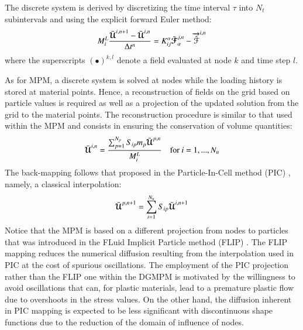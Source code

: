 The discrete system is derived by discretizing the time interval $\tau$ into $N_t$ subintervals and using the explicit forward Euler method:
\begin{equation}
  \label{eq:DGMPM_discrete}
  M^L_i \frac{\bar{{\boldsymbol{\mathcal{U}}}}^{i,n+1} - \bar{{\boldsymbol{\mathcal{U}}}}^{i,n}}{\Delta t^{n} } = K^\alpha_{ij} \bar{{\boldsymbol{\mathcal{F}}}}_{\alpha}^{j,n} - {\overrightarrow{\hat{\mathcal{F}}}}^{i,n}  
\end{equation}
where the superscripts $(\bullet)^{k,l}$ denote a field evaluated at node $k$ and time step $l$.

As for MPM, a discrete system is solved at nodes while the loading history is stored at material points.
Hence, a reconstruction of fields on the grid based on particle values is required as well as a projection of the updated solution from the grid to the material points.
The reconstruction procedure is similar to that used within the MPM and consists in ensuring the conservation of volume quantities:
\begin{equation}
  \label{eq:reconstruction}
  \bar{{\boldsymbol{\mathcal{U}}}}^{i,n} =  \frac{\sum_{p=1}^{N_p}S_{ip}m_p\bar{{\boldsymbol{\mathcal{U}}}}^{p,n}}{M_{i}^L }  \quad \text{for } i=1,...,N_n
\end{equation}
The back-mapping follows that proposed in the Particle-In-Cell method (PIC) \cite{PIC}, namely, a classical interpolation:
\begin{equation}
  \label{eq:back_mapping}
  \bar{{\boldsymbol{\mathcal{U}}}}^{p,n+1}=\sum_{i=1}^{N_n} S_{ip}\bar{{\boldsymbol{\mathcal{U}}}}^{i,n+1}
\end{equation}
Notice that the MPM is based on a different projection from nodes to particles that was introduced in the FLuid Implicit Particle method (FLIP) \cite{Mass_Flip}.
The FLIP mapping reduces the numerical diffusion resulting from the interpolation used in PIC at the cost of spurious oscillations.
The employment of the PIC projection rather than the FLIP one within the DGMPM is motivated by the willingness to avoid oscillations that can, for plastic materials, lead to a premature plastic flow due to overshoots in the stress values.
On the other hand, the diffusion inherent in PIC mapping is expected to be less significant with discontinuous shape functions due to the reduction of the domain of influence of nodes.

